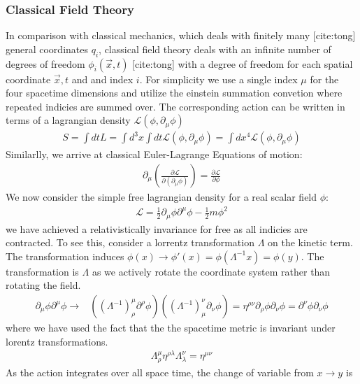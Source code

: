 \subsubsection{Classical Field Theory}
In comparison with classical mechanics, which deals with finitely many [cite:tong] general
 coordinates $q_i$, classical field theory deals with an infinite number of degrees of freedom 
$\phi_i(\vec x, t)$ [cite:tong] with a degree of freedom for each spatial coordinate  $\vec x,t$ and 
and index $i$. For simplicity we use a single index $\mu$ for the four spacetime dimensions and utilize
the einstein summation convetion where repeated indicies are summed over. 
The corresponding action can be written in terms of a lagrangian density $\mathcal{L}(\phi,\partial_\mu \phi)$
\begin{align*}
S = \int dt L = \int d^3x \int dt \mathcal{L}(\phi,\partial_\mu \phi) = \int dx^4 \mathcal{L}(\phi,\partial_\mu \phi)
\end{align*}
Similarlly, we arrive at classical Euler-Lagrange Equations of motion:
\begin{align*}
\partial_\mu \left( \frac{\partial\mathcal{L}}{\partial (\partial_\mu \phi)}\right) = \frac{\partial \mathcal{L}}{\partial\phi}
\end{align*}
We now consider the simple free lagrangian density for a real scalar field $\phi$:
\begin{align*}
\mathcal{L} = \frac{1}{2}\partial_\mu \phi \partial^\mu \phi - \frac{1}{2} m\phi^2 
\end{align*}
we have achieved a relativistically invariance for free as all indicies are contracted. To see this, consider a lorrentz transformation $\Lambda$ on the kinetic term. The transformation induces $\phi(x) \rightarrow \phi'(x) = \phi(\Lambda^{-1} x) = \phi (y)$. The transformation is $\Lambda$ as we actively
rotate the coordinate system rather than rotating the field. 
\begin{align*} 
\partial_\mu \phi \partial^\mu \phi \rightarrow& ((\Lambda^{-1})^\mu_\rho \partial^\rho \phi)( (\Lambda^{-1})_\mu^\nu \partial_\nu \phi) 
= \eta^{\rho\nu} \partial_\rho \phi \partial_\nu \phi 
= \partial^\nu \phi \partial_\nu \phi 
\end{align*}
where we have used the fact that the the spacetime metric is invariant under lorentz transformations.
\begin{align*}
\Lambda^\mu_\rho \eta^{\rho \lambda} \Lambda_{\lambda}^\nu = \eta^{\mu\nu}
\end{align*}
As the action integrates over all space time, the change of variable from $x\rightarrow y$ is
